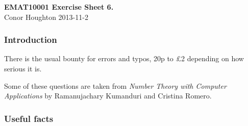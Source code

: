 \documentclass[12pt]{article}
\begin{document}
\begin{center}
{\bf EMAT10001 Exercise Sheet 6.}\\[1cm]{} Conor Houghton 2013-11-2
\end{center}
\subsubsection*{Introduction} 
There is the usual bounty for errors and typos, 20p to \pounds 2
depending on how serious it is.

Some of these questions are taken from \emph{Number Theory with
  Computer Applications} by Ramanujachary Kumanduri and Cristina
Romero.

\subsubsection*{Useful facts}
\end{document}
